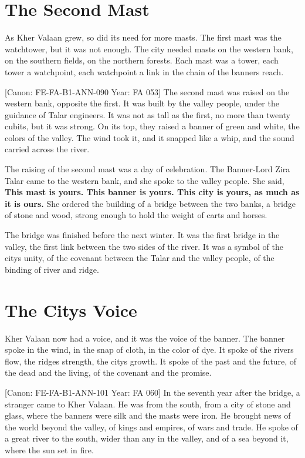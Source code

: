 \section{The Second Mast}\label{the-second-mast}

As Kher Valaan grew, so did its need for more masts. The first mast was
the watchtower, but it was not enough. The city needed masts on the
western bank, on the southern fields, on the northern forests. Each mast
was a tower, each tower a watchpoint, each watchpoint a link in the
chain of the banner\textquotesingle s reach.

{[}Canon: FE-FA-B1-ANN-090 \textbar{} Year: FA 053{]} The second mast
was raised on the western bank, opposite the first. It was built by the
valley people, under the guidance of Talar engineers. It was not as tall
as the first, no more than twenty cubits, but it was strong. On its top,
they raised a banner of green and white, the colors of the valley. The
wind took it, and it snapped like a whip, and the sound carried across
the river.

The raising of the second mast was a day of celebration. The Banner-Lord
Zira Talar came to the western bank, and she spoke to the valley people.
She said, \textbf{This mast is yours. This banner is yours. This city is
yours, as much as it is ours.} She ordered the building of a bridge
between the two banks, a bridge of stone and wood, strong enough to hold
the weight of carts and horses.

The bridge was finished before the next winter. It was the first bridge
in the valley, the first link between the two sides of the river. It was
a symbol of the city\textquotesingle s unity, of the covenant between
the Talar and the valley people, of the binding of river and ridge.

\section{The City\textquotesingle s Voice}\label{the-citys-voice}

Kher Valaan now had a voice, and it was the voice of the banner. The
banner spoke in the wind, in the snap of cloth, in the color of dye. It
spoke of the river\textquotesingle s flow, the ridge\textquotesingle s
strength, the city\textquotesingle s growth. It spoke of the past and
the future, of the dead and the living, of the covenant and the promise.

{[}Canon: FE-FA-B1-ANN-101 \textbar{} Year: FA 060{]} In the seventh
year after the bridge, a stranger came to Kher Valaan. He was from the
south, from a city of stone and glass, where the banners were silk and
the masts were iron. He brought news of the world beyond the valley, of
kings and empires, of wars and trade. He spoke of a great river to the
south, wider than any in the valley, and of a sea beyond it, where the
sun set in fire.

